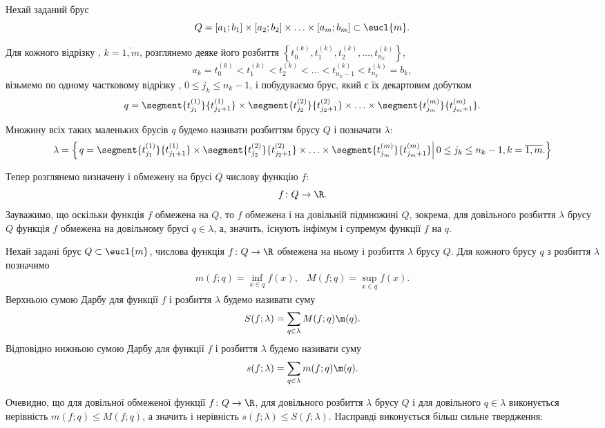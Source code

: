 \begin{definition}
Нехай заданий брус
\[
Q = [a_1;b_1]\times[a_2;b_2]\times\ldots\times[a_m;b_m] \subset \eucl{m}.
\]

Для кожного відрізку , ${k=\overline{1,m}}$, розглянемо деяке його розбиття ${\left\{t_0^{(k)}, t_1^{(k)}, t_2^{(k)}, \ldots, t_{n_k}^{(k)}\right\}}$,
\[
a_k = t_0^{(k)} < t_1^{(k)} < t_2^{(k)} < \ldots  < t_{n_k-1}^{(k)} < t_{n_k}^{(k)} = b_k,
\]
візьмемо по одному частковому відрізку , ${0 \leq j_k \leq n_k - 1}$, і побудуваємо брус, який є їх декартовим добутком
\[
q = \segment{t^{(1)}_{j_1}}{t^{(1)}_{j_1+1}}\times\segment{t^{(2)}_{j_2}}{t^{(2)}_{j_2+1}}\times\ldots\times\segment{t^{(m)}_{j_m}}{t^{(m)}_{j_m+1}}.
\]

Множину всіх таких маленьких брусів $q$ будемо називати розбиттям брусу $Q$ і позначати ${\lambda}$:
\[
\lambda = \left\{\left. q=\segment{t^{(1)}_{j_1}}{t^{(1)}_{j_1+1}}\times\segment{t^{(2)}_{j_2}}{t^{(2)}_{j_2+1}}\times\ldots\times\segment{t^{(m)}_{j_m}}{t^{(m)}_{j_m+1}}\right|  0 \leq j_k \leq n_k - 1, k=\overline{1,m}. \right\}
\]
\end{definition}
Тепер розглянемо визначену і обмежену на брусі $Q$ числову функцію $f$:
\[
f\colon Q \to \R.
\]
Зауважимо, що оскільки функція $f$ обмежена на $Q$, то $f$ обмежена і на довільній підмножині $Q$, зокрема, для довільного розбиття $\lambda$ брусу $Q$ функція $f$ обмежена на довільному брусі ${q \in \lambda}$, а, значить, існують інфімум і супремум функції $f$ на $q$.
\begin{definition}
Нехай задані брус ${Q\subset\eucl{m}}$, числова функція ${f\colon Q \to \R}$ обмежена на ньому і розбиття $\lambda$ брусу $Q$. Для кожного брусу $q$ з розбиття $\lambda$ позначимо
\[
\begin{array}{cc}
m(f;q) = \inf\limits_{x\in q} f(x), & M(f;q) = \sup\limits_{x\in q} f(x).
\end{array}
\]
Верхньою сумою Дарбу для функції $f$ і розбиття $\lambda$ будемо називати суму
\[
S(f;\lambda) = \sum\limits_{q\in \lambda} M(f;q) \m(q).
\]
Відповідно нижньою сумою Дарбу  для функції $f$ і розбиття $\lambda$ будемо називати суму
\[
s(f;\lambda) = \sum\limits_{q\in \lambda} m(f;q) \m(q).
\]
\end{definition}

Очевидно, що для довільної обмеженої функції ${f\colon Q \to \R}$, для довільного розбиття $\lambda$ брусу $Q$ і для довільного ${q \in \lambda}$ виконується нерівність ${m(f;q) \leq M(f;q)}$, а значить і нерівність ${s(f; \lambda) \leq S(f;\lambda)}$. Насправді виконується більш сильне твердження:


